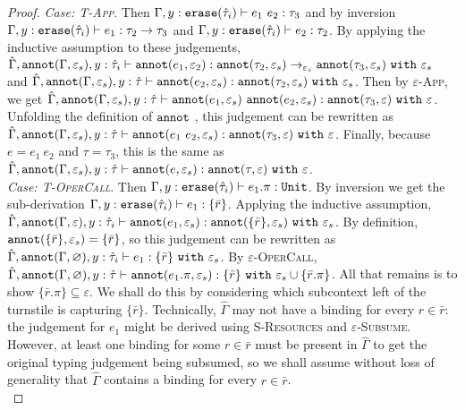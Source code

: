 \begin{appendix}
\begin{proof}
\textit{Case: \textsc{T-App}}. Then $\Gamma, y: \mathtt{erase}(\hat \tau_i) \vdash e_1~e_2: \tau_3$ and by inversion $\Gamma, y:\mathtt{erase}(\hat \tau_i) \vdash e_1: \tau_2 \rightarrow \tau_3$ and $\Gamma, y: \mathtt{erase}(\hat \tau_i) \vdash e_2: \tau_2$. By applying the inductive assumption to these judgements, $\hat \Gamma, \mathtt{annot}(\Gamma, \varepsilon_s), y: \hat \tau_i \vdash \mathtt{annot}(e_1, \varepsilon_2): \mathtt{annot}(\tau_2, \varepsilon_s) \rightarrow_{\varepsilon_s} \mathtt{annot}(\tau_3, \varepsilon_s)~\mathtt{with}~ \varepsilon_s$ and $\hat \Gamma, \mathtt{annot}(\Gamma, \varepsilon_s), y: \hat \tau \vdash \mathtt{annot}(e_2, \varepsilon_s): \mathtt{annot}(\tau_2, \varepsilon_s)~\mathtt{with}~ \varepsilon_s$. Then by \textsc{$\varepsilon$-App}, we get $\hat \Gamma, \mathtt{annot}(\Gamma, \varepsilon_s), y: \hat \tau \vdash \mathtt{annot}(e_1, \varepsilon_s)~\mathtt{annot}(e_2, \varepsilon_s) :  \mathtt{annot}(\tau_3, \varepsilon)~\mathtt{with}~ \varepsilon$. Unfolding the definition of  $\mathtt{annot}$ , this judgement can be rewritten as $\hat \Gamma, \mathtt{annot}(\Gamma, \varepsilon_s), y: \hat \tau \vdash \mathtt{annot}(e_1~e_2, \varepsilon_s) :  \mathtt{annot}(\tau_3, \varepsilon)~\mathtt{with}~ \varepsilon$. Finally, because $e = e_1~e_2$ and $\tau = \tau_3$, this is the same as $\hat \Gamma, \mathtt{annot}(\Gamma, \varepsilon_s), y: \hat \tau \vdash \mathtt{annot}(e, \varepsilon_s) :  \mathtt{annot}(\tau, \varepsilon)~\mathtt{with}~ \varepsilon$.
\\

\noindent
\textit{Case: \textsc{T-OperCall}}. Then $\Gamma, y: \mathtt{erase}(\hat \tau_i) \vdash e_1.\pi : \mathtt{Unit}$. By inversion we get the sub-derivation $\Gamma, y: \mathtt{erase}(\hat \tau_i) \vdash e_1: \{ \bar r \}$. Applying the inductive assumption, $\hat \Gamma, \mathtt{annot}(\Gamma, \varepsilon), y: \hat \tau_i \vdash \mathtt{annot}(e_1, \varepsilon_s): \mathtt{annot}(\{ \bar r \}, \varepsilon_s)~\mathtt{with}~ \varepsilon_s$. By definition, $\mathtt{annot}(\{ \bar r \}, \varepsilon_s) = \{ \bar r \}$, so this judgement can be rewritten as $\hat \Gamma, \mathtt{annot}(\Gamma, \varnothing), y: \hat \tau_i \vdash e_1: \{ \bar r \}~\mathtt{with}~ \varepsilon_s$. By \textsc{$\varepsilon$-OperCall}, $\hat \Gamma, \mathtt{annot}(\Gamma, \varnothing), y: \hat \tau \vdash \mathtt{annot}(e_1.\pi, \varepsilon_s): \{ \bar r \} ~\mathtt{with}~ \varepsilon_s \cup \{ \bar r.\pi \}$. All that remains is to show $\{ \bar r.\pi \} \subseteq \varepsilon$. We shall do this by considering which subcontext left of the turnstile is capturing $\{ \bar r \}$. Technically, $\hat \Gamma$ may not have a binding for every $r \in \bar r$: the judgement for $e_1$ might be derived using \textsc{S-Resources} and \textsc{$\varepsilon$-Subsume}. However, at least one binding for some $r \in \bar r$ must be present in $\hat \Gamma$ to get the original typing judgement being subsumed, so we shall assume without loss of generality that $\hat \Gamma$ contains a binding for every $r \in \bar r$. \\


\end{proof}
\end{appendix}
